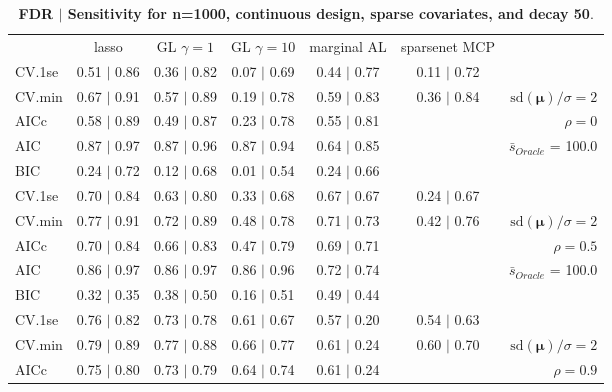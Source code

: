 \begin{table}\vspace{-.5cm}
\caption[l]{ {\it }
{ \bf FDR $\boldsymbol{\mid}$ Sensitivity for n=1000, continuous design, sparse covariates, and  decay  50}.}
\vspace{-.5cm}
\footnotesize{}
\begin{center}
\begin{tabular}{l*{5}{c}|r}
 & lasso & GL $\gamma=1$ & GL $\gamma=10$ & marginal AL & sparsenet MCP  & \\
 \cline{1-7}
CV.1se & 0.51 $\mid$ 0.86 & 0.36 $\mid$ 0.82 & 0.07 $\mid$ 0.69 & 0.44 $\mid$ 0.77 & 0.11 $\mid$ 0.72 & \\
CV.min & 0.67 $\mid$ 0.91 & 0.57 $\mid$ 0.89 & 0.19 $\mid$ 0.78 & 0.59 $\mid$ 0.83 & 0.36 $\mid$ 0.84 &  $\mathrm{sd}(\mathbf{\mu})/\sigma=2$ \\
AICc & 0.58 $\mid$ 0.89 & 0.49 $\mid$ 0.87 & 0.23 $\mid$ 0.78 & 0.55 $\mid$ 0.81 & & $\rho=0$ \\
AIC & 0.87 $\mid$ 0.97 & 0.87 $\mid$ 0.96 & 0.87 $\mid$ 0.94 & 0.64 $\mid$ 0.85 & &  \multirow{2}{*}{$\bar{s}_{Oracle}$ = 100.0} \\
BIC & 0.24 $\mid$ 0.72 & 0.12 $\mid$ 0.68 & 0.01 $\mid$ 0.54 & 0.24 $\mid$ 0.66 & &  \\
 \hline 
CV.1se & 0.70 $\mid$ 0.84 & 0.63 $\mid$ 0.80 & 0.33 $\mid$ 0.68 & 0.67 $\mid$ 0.67 & 0.24 $\mid$ 0.67 & \\
CV.min & 0.77 $\mid$ 0.91 & 0.72 $\mid$ 0.89 & 0.48 $\mid$ 0.78 & 0.71 $\mid$ 0.73 & 0.42 $\mid$ 0.76 &  $\mathrm{sd}(\mathbf{\mu})/\sigma=2$ \\
AICc & 0.70 $\mid$ 0.84 & 0.66 $\mid$ 0.83 & 0.47 $\mid$ 0.79 & 0.69 $\mid$ 0.71 & & $\rho=0.5$ \\
AIC & 0.86 $\mid$ 0.97 & 0.86 $\mid$ 0.97 & 0.86 $\mid$ 0.96 & 0.72 $\mid$ 0.74 & &  \multirow{2}{*}{$\bar{s}_{Oracle}$ = 100.0} \\
BIC & 0.32 $\mid$ 0.35 & 0.38 $\mid$ 0.50 & 0.16 $\mid$ 0.51 & 0.49 $\mid$ 0.44 & &  \\
 \hline 
CV.1se & 0.76 $\mid$ 0.82 & 0.73 $\mid$ 0.78 & 0.61 $\mid$ 0.67 & 0.57 $\mid$ 0.20 & 0.54 $\mid$ 0.63 & \\
CV.min & 0.79 $\mid$ 0.89 & 0.77 $\mid$ 0.88 & 0.66 $\mid$ 0.77 & 0.61 $\mid$ 0.24 & 0.60 $\mid$ 0.70 &  $\mathrm{sd}(\mathbf{\mu})/\sigma=2$ \\
AICc & 0.75 $\mid$ 0.80 & 0.73 $\mid$ 0.79 & 0.64 $\mid$ 0.74 & 0.61 $\mid$ 0.24 & & $\rho=0.9$ \\

\end{tabular}
\end{center}
\end{table}
